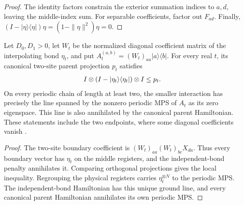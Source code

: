 \begin{proof}\leanok
    The identity factors constrain the exterior summation indices to
    $a,d$, leaving the middle-index sum. For separable coefficients,
    factor out $F_{ad}$. Finally,
    $(I-|\eta\rangle\langle\eta|)\eta=(1-\|\eta\|^2)\eta=0$.
\end{proof}

\begin{lemma}
    \label{thm:spt_weighted_matrix_unit_parent_comparison}
    \leanok
    Let $D_0,D_1>0$, let $W_t$ be the normalized diagonal coefficient
    matrix of the interpolating bond $\eta_t$, and put
    $A_t^{(a,b)}=(W_t)_{aa}|a\rangle\langle b|$.
    For every real $t$, its canonical two-site parent projection $p_t$
    satisfies
    \begin{align}
        I\otimes(I-|\eta_t\rangle\langle\eta_t|)\otimes I & \leq p_t.
        \notag
    \end{align}
    On every periodic chain of length at least two, the smaller interaction
    has precisely the line spanned by the nonzero periodic MPS of $A_t$
    as its zero eigenspace. This line is also annihilated by the canonical
    parent Hamiltonian. These statements include the two endpoints, where
    some diagonal coefficients vanish
    \cite[Section~II.F.2]{Schuch2011Phases}.
\end{lemma}

\begin{proof}\leanok
    The two-site boundary coefficient is
    $(W_t)_{aa}(W_t)_{bc}X_{da}$. Thus every boundary vector has $\eta_t$
    on the middle registers, and the independent-bond penalty annihilates
    it. Comparing orthogonal projections gives the local inequality.
    Regrouping the physical registers carries $\eta_t^{\otimes N}$ to
    the periodic MPS. The independent-bond Hamiltonian has this unique
    ground line, and every canonical parent Hamiltonian annihilates its
    own periodic MPS.
\end{proof}

